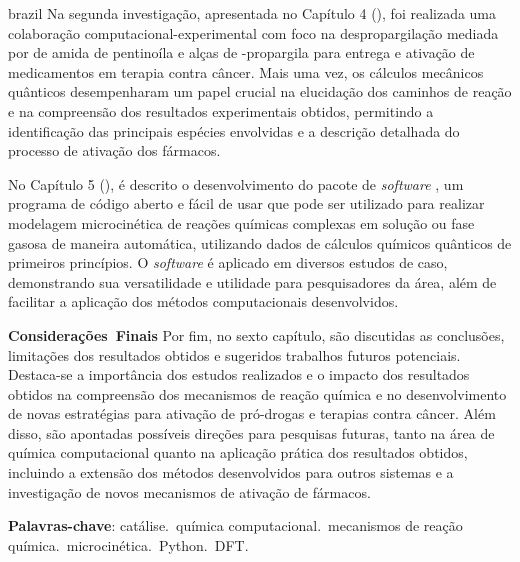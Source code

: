 \begin{resumo}
\begin{otherlanguage*}{brazil}
		Na segunda investigação,
		apresentada no Capítulo 4 (),
		foi realizada uma colaboração computacional-experimental com foco na despropargilação mediada por  de amida de pentinoíla e alças de -propargila para entrega e ativação de medicamentos em terapia contra câncer.
		Mais uma vez,
		os cálculos mecânicos quânticos desempenharam um papel crucial na elucidação dos caminhos de reação e na compreensão dos resultados experimentais obtidos,
		permitindo a identificação das principais espécies envolvidas e a descrição detalhada do processo de ativação dos fármacos.

		No Capítulo 5 (),
		é descrito o desenvolvimento do pacote de \emph{software} \overreact{},
		um programa de código aberto e fácil de usar que pode ser utilizado para realizar modelagem microcinética de reações químicas complexas em solução ou fase gasosa de maneira automática,
		utilizando dados de cálculos químicos quânticos de primeiros princípios.
		O \emph{software} é aplicado em diversos estudos de caso,
		demonstrando sua versatilidade e utilidade para pesquisadores da área,
		além de facilitar a aplicação dos métodos computacionais desenvolvidos.

		\mbox{\textbf{Considerações~Finais}}\linebreak
		Por fim,
		no sexto capítulo,
		são discutidas as conclusões,
		limitações dos resultados obtidos e sugeridos trabalhos futuros potenciais.
		Destaca-se a importância dos estudos realizados e o impacto dos resultados obtidos na compreensão dos mecanismos de reação química e no desenvolvimento de novas estratégias para ativação de pró-drogas e terapias contra câncer.
		Além disso,
		são apontadas possíveis direções para pesquisas futuras,
		tanto na área de química computacional quanto na aplicação prática dos resultados obtidos,
		incluindo a extensão dos métodos desenvolvidos para outros sistemas e a investigação de novos mecanismos de ativação de fármacos.

		\vspace{\onelineskip}

		\noindent
		\textbf{Palavras-chave}:
		catálise.\ química computacional.\ mecanismos de reação química.\ microcinética.\ Python.\ DFT.\@
	\end{otherlanguage*}
\end{resumo}

